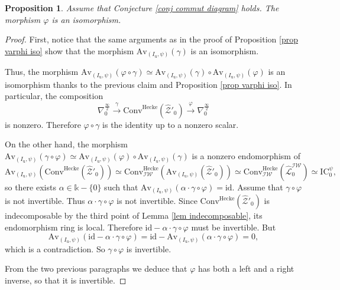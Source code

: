 \documentclass[11pt]{amsart}
\theoremstyle{plain}
\newtheorem{prop}[thm]{Proposition}
\theoremstyle{remark}
\numberwithin{equation}{section}
\begin{document}
\begin{prop}
Assume that Conjecture \ref{conj commut diagram} holds. The morphism $\varphi$ is an isomorphism.
\end{prop}
\begin{proof}
    First, notice that the same arguments as in the proof of Proposition \ref{prop varphi iso} show that the morphism $\mathrm{Av}_{(I_\mathrm{u},\psi)}(\gamma)$ is an isomorphism.

    Thus, the morphism $\mathrm{Av}_{(I_\mathrm{u},\psi)}(\varphi\circ\gamma)\simeq \mathrm{Av}_{(I_\mathrm{u},\psi)}(\gamma)\circ\mathrm{Av}_{(I_\mathrm{u},\psi)}(\varphi)$ is an isomorphism thanks to the previous claim and Proposition \ref{prop varphi iso}. In particular, the composition
    $$\nabla^{\frac{\infty}{2}}_0\xrightarrow{\gamma}\mathrm{Conv}^{\mathrm{Hecke}}(\widehat{\mathcal{Z}}'_0)\xrightarrow{\varphi}\nabla^{\frac{\infty}{2}}_0$$
    is nonzero. Therefore $\varphi\circ\gamma$ is the identity up to a nonzero scalar.
    
   On the other hand, the morphism $\mathrm{Av}_{(I_\mathrm{u},\psi)}(\gamma\circ\varphi)\simeq \mathrm{Av}_{(I_\mathrm{u},\psi)}(\varphi)\circ\mathrm{Av}_{(I_\mathrm{u},\psi)}(\gamma)$ is a nonzero endomorphism of 
   $$\mathrm{Av}_{(I_\mathrm{u},\psi)}(\mathrm{Conv}^{\mathrm{Hecke}}(\widehat{\mathcal{Z}}'_0))\simeq\mathrm{Conv}^{\mathrm{Hecke}}_\mathcal{IW}(\mathrm{Av}_{(I_\mathrm{u},\psi)}(\widehat{\mathcal{Z}}'_0))\simeq\mathrm{Conv}^{\mathrm{Hecke}}_\mathcal{IW}(\widehat{\mathcal{L}}^\mathcal{IW}_0)\simeq\mathrm{IC}^\psi_0,$$ 
   so there exists $\alpha\in\mathbb{k}-\{0\}$ such that $\mathrm{Av}_{(I_\mathrm{u},\psi)}(\alpha\cdot\gamma\circ\varphi)=\mathrm{id}$. Assume that $\gamma\circ\varphi$ is not invertible. Thus $\alpha\cdot\gamma\circ\varphi$ is not invertible. Since $\mathrm{Conv}^{\mathrm{Hecke}}(\widehat{\mathcal{Z}}'_0)$ is indecomposable by the third point of Lemma \ref{lem indecomposable}, its endomorphism ring is local. Therefore $\mathrm{id}-\alpha\cdot\gamma\circ\varphi$ must be invertible. But
   $$\mathrm{Av}_{(I_\mathrm{u},\psi)}(\mathrm{id}-\alpha\cdot\gamma\circ\varphi)=\mathrm{id}- \mathrm{Av}_{(I_\mathrm{u},\psi)}(\alpha\cdot\gamma\circ\varphi)=0,$$
   which is a contradiction. So  $\gamma\circ\varphi$ is invertible.

   From the two previous paragraphs we deduce that $\varphi$ has both a left and a right inverse, so that it is invertible.
\end{proof}
\end{document}
